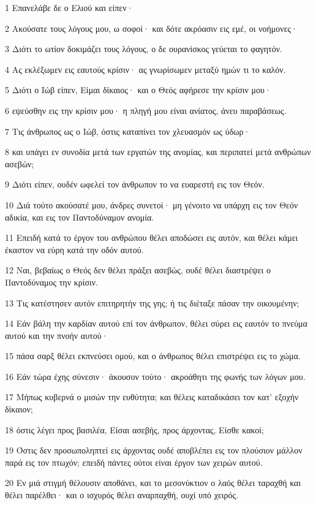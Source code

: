 \par 1 Επανελάβε δε ο Ελιού και είπεν·
\par 2 Ακούσατε τους λόγους μου, ω σοφοί· και δότε ακρόασιν εις εμέ, οι νοήμονες·
\par 3 Διότι το ωτίον δοκιμάζει τους λόγους, ο δε ουρανίσκος γεύεται το φαγητόν.
\par 4 Ας εκλέξωμεν εις εαυτούς κρίσιν· ας γνωρίσωμεν μεταξύ ημών τι το καλόν.
\par 5 Διότι ο Ιώβ είπεν, Είμαι δίκαιος· και ο Θεός αφήρεσε την κρίσιν μου·
\par 6 εψεύσθην εις την κρίσιν μου· η πληγή μου είναι ανίατος, άνευ παραβάσεως.
\par 7 Τις άνθρωπος ως ο Ιώβ, όστις καταπίνει τον χλευασμόν ως ύδωρ·
\par 8 και υπάγει εν συνοδία μετά των εργατών της ανομίας, και περιπατεί μετά ανθρώπων ασεβών;
\par 9 Διότι είπεν, ουδέν ωφελεί τον άνθρωπον το να ευαρεστή εις τον Θεόν.
\par 10 Διά τούτο ακούσατέ μου, άνδρες συνετοί· μη γένοιτο να υπάρχη εις τον Θεόν αδικία, και εις τον Παντοδύναμον ανομία.
\par 11 Επειδή κατά το έργον του ανθρώπου θέλει αποδώσει εις αυτόν, και θέλει κάμει έκαστον να εύρη κατά την οδόν αυτού.
\par 12 Ναι, βεβαίως ο Θεός δεν θέλει πράξει ασεβώς, ουδέ θέλει διαστρέψει ο Παντοδύναμος την κρίσιν.
\par 13 Τις κατέστησεν αυτόν επιτηρητήν της γης; ή τις διέταξε πάσαν την οικουμένην;
\par 14 Εάν βάλη την καρδίαν αυτού επί τον άνθρωπον, θέλει σύρει εις εαυτόν το πνεύμα αυτού και την πνοήν αυτού·
\par 15 πάσα σαρξ θέλει εκπνεύσει ομού, και ο άνθρωπος θέλει επιστρέψει εις το χώμα.
\par 16 Εάν τώρα έχης σύνεσιν· άκουσον τούτο· ακροάθητι της φωνής των λόγων μου.
\par 17 Μήπως κυβερνά ο μισών την ευθύτητα; και θέλεις καταδικάσει τον κατ' εξοχήν δίκαιον;
\par 18 όστις λέγει προς βασιλέα, Είσαι ασεβής, προς άρχοντας, Είσθε κακοί;
\par 19 Όστις δεν προσωποληπτεί εις άρχοντας ουδέ αποβλέπει εις τον πλούσιον μάλλον παρά εις τον πτωχόν; επειδή πάντες ούτοι είναι έργον των χειρών αυτού.
\par 20 Εν μιά στιγμή θέλουσιν αποθάνει, και το μεσονύκτιον ο λαός θέλει ταραχθή και θέλει παρέλθει· και ο ισχυρός θέλει αναρπαχθή, ουχί υπό χειρός.
